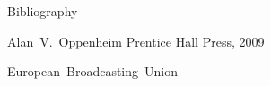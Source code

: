 \documentclass[compress]{beamer}
\begin{document}
\begin{frame}{Bibliography}
    \begin{thebibliography}{10}

            \beamertemplatebookbibitems
            Alan~V.~Oppenheim
            \newblock {}
            \newblock Prentice Hall Press, 2009

            \beamertemplatearticlebibitems
            European~Broadcasting~Union
            \newblock {}
    \end{thebibliography}
\end{frame}
\end{document}
